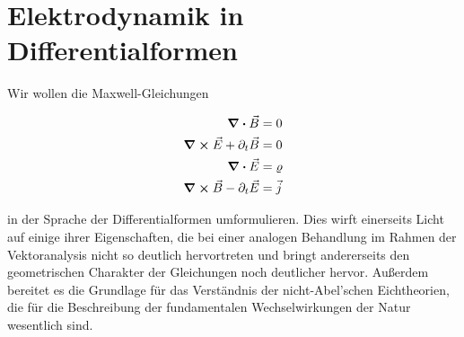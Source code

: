 \section{Elektrodynamik in Differentialformen}
Wir wollen die Maxwell-Gleichungen

\begin{align}
\div{\vec{B}} &= 0 \\
\curl \vec{E} + \partial_t \vec{B} &= 0 \\
\div{\vec{E}} &= \varrho \\
\curl \vec{B} - \partial_t \vec{E} &= \vec{j}
\end{align} 

in der Sprache der Differentialformen umformulieren. Dies wirft einerseits Licht auf einige ihrer Eigenschaften, die bei einer analogen Behandlung im Rahmen der Vektoranalysis nicht so deutlich hervortreten und bringt andererseits den geometrischen Charakter der Gleichungen noch deutlicher hervor. Außerdem bereitet es die Grundlage für das Verständnis der nicht-Abel'schen Eichtheorien, die für die Beschreibung der fundamentalen Wechselwirkungen der Natur wesentlich sind.